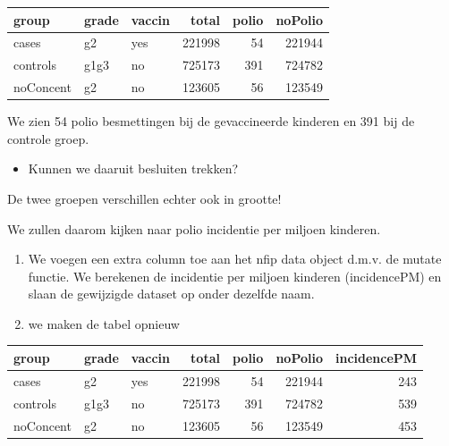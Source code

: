 \documentclass[
  dutch,
  letterpaper,
  12pt]{book}
\newenvironment{Shaded}{\begin{snugshade}}{\end{snugshade}}
\newcommand{\AttributeTok}[1]{\textcolor[rgb]{0.40,0.45,0.13}{#1}}
\newcommand{\DecValTok}[1]{\textcolor[rgb]{0.68,0.00,0.00}{#1}}
\newcommand{\FloatTok}[1]{\textcolor[rgb]{0.68,0.00,0.00}{#1}}
\newcommand{\FunctionTok}[1]{\textcolor[rgb]{0.28,0.35,0.67}{#1}}
\newcommand{\NormalTok}[1]{\textcolor[rgb]{0.00,0.23,0.31}{#1}}
\newcommand{\OtherTok}[1]{\textcolor[rgb]{0.00,0.23,0.31}{#1}}
\newcommand{\SpecialCharTok}[1]{\textcolor[rgb]{0.37,0.37,0.37}{#1}}
\providecommand{\tightlist}{%
  \setlength{\itemsep}{0pt}\setlength{\parskip}{0pt}}
\theoremstyle{definition}
\theoremstyle{definition}
\theoremstyle{definition}
\theoremstyle{remark}
\begin{document}
\begin{tabular}{l|l|l|r|r|r}
\hline
group & grade & vaccin & total & polio & noPolio\\
\hline
cases & g2 & yes & 221998 & 54 & 221944\\
\hline
controls & g1g3 & no & 725173 & 391 & 724782\\
\hline
noConcent & g2 & no & 123605 & 56 & 123549\\
\hline
\end{tabular}

We zien 54 polio besmettingen bij de gevaccineerde kinderen en 391 bij
de controle groep.

\begin{itemize}
\tightlist
\item
  Kunnen we daaruit besluiten trekken?
\end{itemize}

De twee groepen verschillen echter ook in grootte!

We zullen daarom kijken naar polio incidentie per miljoen kinderen.

\begin{enumerate}
\def\labelenumi{\arabic{enumi}.}
\tightlist
\item
  We voegen een extra column toe aan het nfip data object d.m.v. de
  mutate functie. We berekenen de incidentie per miljoen kinderen
  (incidencePM) en slaan de gewijzigde dataset op onder dezelfde naam.
\item
  we maken de tabel opnieuw
\end{enumerate}

\begin{Shaded}
\end{Shaded}

\begin{tabular}{l|l|l|r|r|r|r}
\hline
group & grade & vaccin & total & polio & noPolio & incidencePM\\
\hline
cases & g2 & yes & 221998 & 54 & 221944 & 243\\
\hline
controls & g1g3 & no & 725173 & 391 & 724782 & 539\\
\hline
noConcent & g2 & no & 123605 & 56 & 123549 & 453\\
\hline
\end{tabular}
\end{document}
